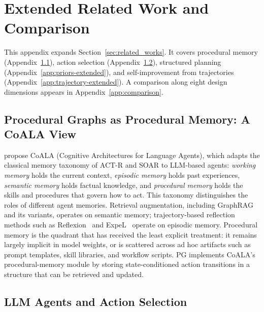 \appendix

\section{Extended Related Work and Comparison}
\label{app:related_extended}

This appendix expands Section~\ref{sec:related_works}. It covers procedural memory (Appendix~\ref{app:coala}), action selection (Appendix~\ref{app:agents-extended}), structured planning (Appendix~\ref{app:priors-extended}), and self-improvement from trajectories (Appendix~\ref{app:trajectory-extended}). A comparison along eight design dimensions appears in Appendix~\ref{app:comparison}.

\subsection{Procedural Graphs as Procedural Memory: A CoALA View}
\label{app:coala}

\citet{sumers2023cognitive} propose CoALA (Cognitive Architectures for Language Agents), which adapts the classical memory taxonomy of ACT-R and SOAR to LLM-based agents: \emph{working memory} holds the current context, \emph{episodic memory} holds past experiences, \emph{semantic memory} holds factual knowledge, and \emph{procedural memory} holds the skills and procedures that govern how to act. This taxonomy distinguishes the roles of different agent memories. Retrieval augmentation, including GraphRAG and its variants, operates on semantic memory; trajectory-based reflection methods such as Reflexion~\citep{shinn2023reflexion} and ExpeL~\citep{zhao2024expel} operate on episodic memory. Procedural memory is the quadrant that has received the least explicit treatment: it remains largely implicit in model weights, or is scattered across ad hoc artifacts such as prompt templates, skill libraries, and workflow scripts. PG implements CoALA's procedural-memory module by storing state-conditioned action transitions in a structure that can be retrieved and updated.

\subsection{LLM Agents and Action Selection}
\label{app:agents-extended}

